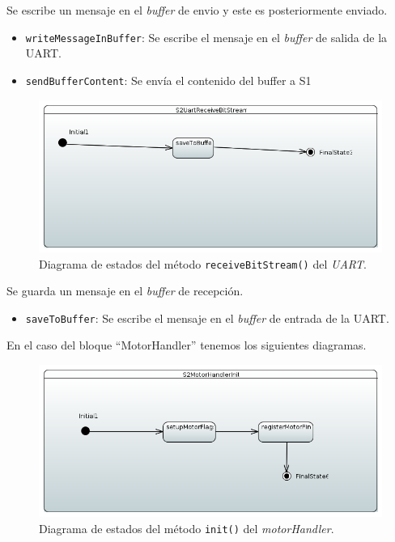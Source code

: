 Se escribe un mensaje en el \textit{buffer} de envio y este es posteriormente enviado.

\begin{itemize}
    \item \texttt{writeMessageInBuffer}: Se escribe el mensaje en el \textit{buffer} de salida de la UART.
    \item \texttt{sendBufferContent}: Se envía el contenido del buffer a \ac{S1}
\end{itemize}

\begin{figure}[H]
    \centering
    \includegraphics[width=1\linewidth]{pictures/S2UartReceiveBitStream.PNG}
    \caption{Diagrama de estados del método \texttt{receiveBitStream()} del \textit{UART}.}
    \label{fig:fun_receive_bit_stream_uart}
\end{figure}

Se guarda un mensaje en el \textit{buffer} de recepción.

\begin{itemize}
    \item \texttt{saveToBuffer}: Se escribe el mensaje en el \textit{buffer} de entrada de la UART.
\end{itemize}


En el caso del bloque “MotorHandler” tenemos los siguientes diagramas.

\begin{figure}[H]
    \centering
    \includegraphics[width=1\linewidth]{pictures/S2MotorHandlerInit.PNG}
    \caption{Diagrama de estados del método \texttt{init()} del \textit{motorHandler}.}
    \label{fig:fun_init_motor_handler}
\end{figure}

